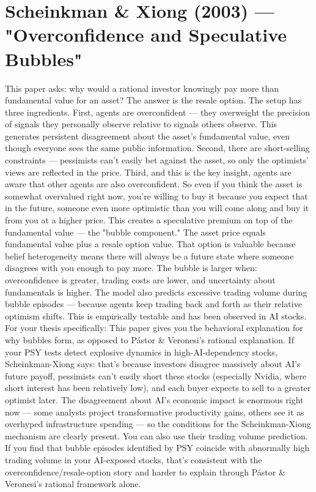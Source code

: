 \section{Scheinkman & Xiong (2003) — "Overconfidence and Speculative Bubbles"}
This paper asks: why would a rational investor knowingly pay more than fundamental value for an asset? The answer is the resale option.
The setup has three ingredients. First, agents are overconfident — they overweight the precision of signals they personally observe relative to signals others observe. This generates persistent disagreement about the asset's fundamental value, even though everyone sees the same public information. Second, there are short-selling constraints — pessimists can't easily bet against the asset, so only the optimists' views are reflected in the price. Third, and this is the key insight, agents are aware that other agents are also overconfident. So even if you think the asset is somewhat overvalued right now, you're willing to buy it because you expect that in the future, someone even more optimistic than you will come along and buy it from you at a higher price.
This creates a speculative premium on top of the fundamental value — the "bubble component." The asset price equals fundamental value plus a resale option value. That option is valuable because belief heterogeneity means there will always be a future state where someone disagrees with you enough to pay more. The bubble is larger when: overconfidence is greater, trading costs are lower, and uncertainty about fundamentals is higher.
The model also predicts excessive trading volume during bubble episodes — because agents keep trading back and forth as their relative optimism shifts. This is empirically testable and has been observed in AI stocks.
For your thesis specifically:
This paper gives you the behavioral explanation for why bubbles form, as opposed to Pástor & Veronesi's rational explanation. If your PSY tests detect explosive dynamics in high-AI-dependency stocks, Scheinkman-Xiong says: that's because investors disagree massively about AI's future payoff, pessimists can't easily short these stocks (especially Nvidia, where short interest has been relatively low), and each buyer expects to sell to a greater optimist later. The disagreement about AI's economic impact is enormous right now — some analysts project transformative productivity gains, others see it as overhyped infrastructure spending — so the conditions for the Scheinkman-Xiong mechanism are clearly present.
You can also use their trading volume prediction. If you find that bubble episodes identified by PSY coincide with abnormally high trading volume in your AI-exposed stocks, that's consistent with the overconfidence/resale-option story and harder to explain through Pástor & Veronesi's rational framework alone.


